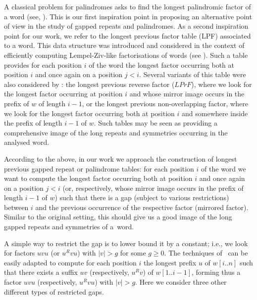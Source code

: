 \documentclass[final]{dmtcs-episciences}
\newcommand{\LPF}{{\mathit{LPrF}}}
\begin{document}
A classical problem for palindromes asks to find the longest palindromic factor of a word (see, \cite{Manacher}). This is our first inspiration point in proposing an alternative point of view in the study of gapped repeats and palindromes. As a second inspiration point for our work, we refer to the longest previous factor table (LPF) associated to a word. This data structure was introduced and considered in the context of efficiently computing Lempel-Ziv-like factorisations of words (see \cite{IlieLPF,power_of_SA}). Such a table provides for each position $i$ of the word the longest factor occurring both at position $i$ and once again on a position $j<i$. Several variants of this table were also considered by \cite{power_of_SA}: the longest previous reverse factor ($\LPF$), where we look for the longest factor occurring at position $i$ and whose mirror image occurs in the prefix of $w$ of length $i-1$, or the longest previous non-overlapping factor, where we look for the longest factor occurring both at position $i$ and somewhere inside the prefix of length $i-1$ of $w$. Such tables may be seen as providing a comprehensive image of the long repeats and symmetries occurring in the analysed word. 

According to the above, in our work we approach the construction of longest previous gapped repeat or palindrome tables: for each position $i$ of the word we want to compute the longest factor occurring both at position $i$ and once again on a position $j<i$ (or, respectively, whose mirror image occurs in the prefix of length $i-1$ of $w$) such that there is a gap (subject to various restrictions) between $i$ and the previous occurrence of the respective factor (mirrored factor). Similar to the original setting, this should give us a good image of the long gapped repeats and symmetries of a~word.

A simple way to restrict the gap is to lower bound it by a constant; i.e., we look for factors $uvu$ (or $u^Rvu$) with $|v|>g$ for some $g\geq 0$. The techniques of~\cite{power_of_SA} can be easily adapted to compute for each position $i$ the longest prefix $u$ of $w[i..n]$ such that there exists a suffix $uv$ (respectively, $u^Rv$) of $w[1..i-1]$, forming thus a factor $uvu$ (respectively, $u^Rvu$) with $|v|>g$. Here we consider three other different types of restricted gaps.
\end{document}
